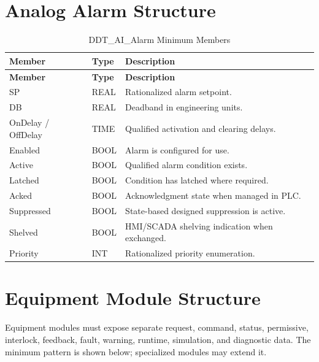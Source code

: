 \section{Analog Alarm Structure}
\begin{longtable}{@{}P{3.61cm}P{3.61cm}P{8.42cm}@{}}
\caption{DDT\_AI\_Alarm Minimum Members}\label{tab:ddt-ai-alarm}\\
\toprule {}\textbf{Member} & \textbf{Type} & \textbf{Description}\\ \midrule
\endfirsthead
\toprule {}\textbf{Member} & \textbf{Type} & \textbf{Description}\\ \midrule
\endhead
SP & REAL & Rationalized alarm setpoint.\\
DB & REAL & Deadband in engineering units.\\
OnDelay / OffDelay & TIME & Qualified activation and clearing delays.\\
Enabled & BOOL & Alarm is configured for use.\\
Active & BOOL & Qualified alarm condition exists.\\
Latched & BOOL & Condition has latched where required.\\
Acked & BOOL & Acknowledgment state when managed in PLC.\\
Suppressed & BOOL & State-based designed suppression is active.\\
Shelved & BOOL & HMI/SCADA shelving indication when exchanged.\\
Priority & INT & Rationalized priority enumeration.\\
\bottomrule
\end{longtable}

\section{Equipment Module Structure}
Equipment modules must expose separate request, command, status, permissive, interlock, feedback, fault, warning, runtime, simulation, and diagnostic data. The minimum pattern is shown below; specialized modules may extend it.

